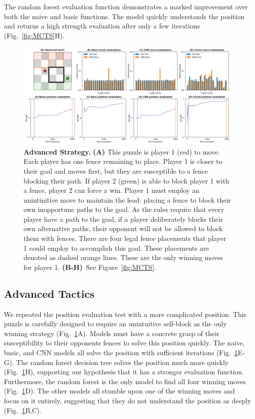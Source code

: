 \documentclass[10pt]{article}
\begin{document}
The random forest evaluation function demonstrates a marked improvement over both the naive and basic functions. The model quickly understands the position and returns a high strength evaluation after only a few iterations (Fig.~\ref{fig:MCTS}H).


\begin{figure}[H]
    \centering
    \includegraphics[width=\linewidth]{Adv_tactic.png}
    \caption{\textbf{Advanced Strategy.} \textbf{(A)} This puzzle is player 1 (red) to move. Each player has one fence remaining to place. Player 1 is closer to their goal and moves first, but they are susceptible to a fence blocking their path. If player 2 (green) is able to block player 1 with a fence, player 2 can force a win. Player 1 must employ an unintinitive move to maintain the lead: placing a fence to block their own inopportune paths to the goal. As the rules require that every player have a path to the goal, if a player deliberately blocks their own alternative paths, their opponent will not be allowed to block them with fences. There are four legal fence placements that player 1 could employ to accomplish this goal. These placements are denoted as dashed orange lines. These are the only winning moves for player 1. \textbf{(B-H)}~See Figure~\ref{fig:MCTS}.}
    \label{fig:AdvTactic}
\end{figure}

\subsection{Advanced Tactics}

We repeated the position evaluation test with a more complicated position. This puzzle is carefully designed to require an unintuitive self-block as the only winning strategy (Fig.~\ref{fig:AdvTactic}A). Models must have a concrete grasp of their susceptibility to their opponents fences to solve this position quickly. The naive, basic, and CNN models all solve the position with sufficient iterations (Fig.~\ref{fig:AdvTactic}E-G). The random forest decision tree solves the position much more quickly (Fig.~\ref{fig:AdvTactic}H), supporting our hypothesis that it has a stronger evaluation function. Furthermore, the random forest is the only model to find all four winning moves (Fig.~\ref{fig:AdvTactic}D). The other models all stumble upon one of the winning moves and focus on it entirely, suggesting that they do not understand the position as deeply (Fig.~\ref{fig:AdvTactic}B,C).


\clearpage


\end{document}
